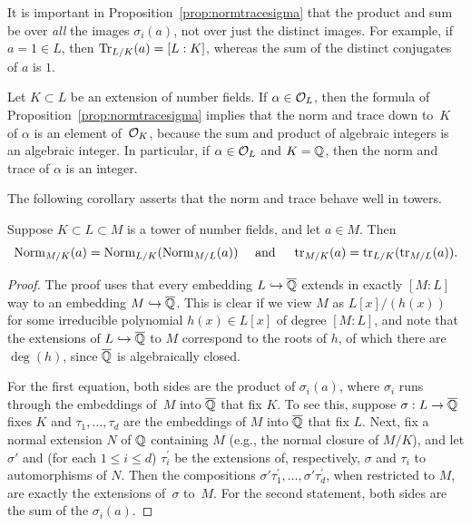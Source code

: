 \begin{warning}
	It is important in Proposition~\ref{prop:normtracesigma} that
	the product and sum be over {\em all} the images $\sigma_i(a)$,
	not over just the distinct images.  For example, if $a=1\in L$, then
	$\operatorname{Tr}_{L/K}(a) = [L:K]$, whereas the sum of the distinct conjugates
	of $a$ is $1$.
\end{warning}

\begin{remark}
	Let $K\subset L$ be an extension of number fields.  If
	$\alpha\in \mathcal{O}_L$, then the formula of
	Proposition~\ref{prop:normtracesigma} implies that the norm and trace
	down to~$K$ of $\alpha$ is an element of~$\mathcal{O}_K$, because the sum and
	product of algebraic integers is an algebraic integer. In particular, 
	if $\alpha \in \mathcal{O}_L$ and $K=\mathbb{Q}$, then the norm and trace of $\alpha$ is an integer. 
\end{remark}

The following corollary asserts that the norm and trace behave well in
towers.
\begin{corollary}
	\label{cor:compatower}
	Suppose $K\subset L \subset M$ is a tower of number fields, and
	let $a\in M$.  Then
	$$
		\operatorname{Norm}_{M/K}(a) = \operatorname{Norm}_{L/K}(\operatorname{Norm}_{M/L}(a))
		\quad\text{ and }\quad
		\operatorname{tr}_{M/K}(a) = \operatorname{tr}_{L/K}(\operatorname{tr}_{M/L}(a)).
	$$
\end{corollary}
\begin{proof}
	The proof uses that every embedding $L\hookrightarrow \overline{\mathbb{Q}}$ extends in exactly
	$[M:L]$ way to an embedding $M\hookrightarrow \overline{\mathbb{Q}}$.  This is clear
	if we view $M$ as $L[x]/(h(x))$ for some irreducible
	polynomial $h(x) \in L[x]$ of degree $[M:L]$, and note that
	the extensions of $L\hookrightarrow \overline{\mathbb{Q}}$ to $M$ correspond to
	the roots of $h$, of which there are $\deg(h)$, since $\overline{\mathbb{Q}}$
	is algebraically closed.
	
	For the first equation, both sides are the product of $\sigma_i(a)$,
	where $\sigma_i$ runs through the embeddings of~$M$ into $\overline{\mathbb{Q}}$
	that fix $K$. To see this, suppose $\sigma:L\to \overline{\mathbb{Q}}$ fixes $K$ and
	$\tau_1,\ldots, \tau_d$ are the embeddings of $M$ into $\overline{\mathbb{Q}}$ that
        fix $L$. Next, fix a normal extension $N$ of $\mathbb{Q}$ containing $M$
	(e.g., the normal closure of $M/K$), and let $\sigma'$ and
	(for each $1 \leq i \leq d$) $\tau_i^'$ be the extensions of,
	respectively, $\sigma$ and $\tau_i$  to automorphisms of $N$.
	Then the compositions $\sigma' \tau_1^{'},\ldots,\sigma'\tau_d^{'}$,
	when restricted to $M$, are exactly the extensions of~$\sigma$ to~$M$.
	For the second statement, both sides are the sum of the $\sigma_i(a)$.
\end{proof}

